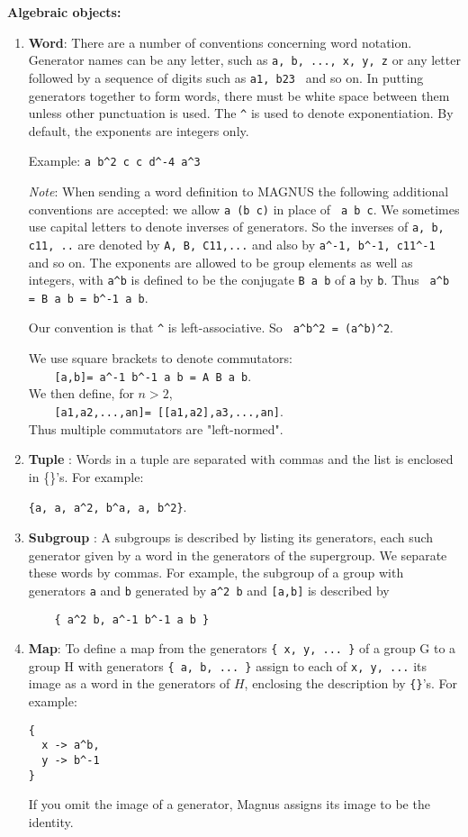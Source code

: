 \documentclass[12pt]{article}
\begin{document}
\textbf{ Algebraic objects:}
\begin{enumerate}
\item \textbf{Word}:
There are a number of conventions concerning word notation.
Generator names can be any letter, such as 
\verb+a, b, ..., x, y, z+
or any letter followed by a sequence of digits such as 
\verb+a1, b23 +
and so on. In putting generators together to form words, there
must be white space between them unless other punctuation is
used. The \verb+^+ is used to denote exponentiation. By default, the
exponents are integers only.

Example: \verb+a b^2 c c d^-4 a^3+

{\em Note}: When sending a word definition to MAGNUS the
following additional conventions are accepted: we allow \verb+a (b c)+
in place of \verb+ a b c+. We sometimes use capital letters to denote
inverses of generators. So the inverses of \verb+a, b, c11, ..+ are
denoted by \verb+A, B, C11,...+ and also by \verb+a^-1, b^-1, c11^-1 +and so
on.  The exponents are allowed to be group elements as well as
integers, with \verb+a^b+ is defined to be the conjugate \verb+B a b+ of 
\verb+a+ by \verb+b+.
Thus \verb+ a^b = B a b = b^-1 a b+.

Our convention is that \verb+^+ is left-associative. So 
\verb+ a^b^2 = (a^b)^2+.

We use square brackets to denote commutators:\\ 
\verb+    [a,b]= a^-1 b^-1 a b = A B a b+.\\
We then define, for $n > 2$, \\
\verb+    [a1,a2,...,an]= [[a1,a2],a3,...,an]+.\\
Thus multiple commutators are "left-normed".

\item \textbf{Tuple} :
Words in a tuple are separated  with
commas and the list is enclosed in \{\}'s. For
example:

\verb+{a, a, a^2, b^a, a, b^2}+.


\item \textbf{Subgroup} : 
A subgroups is described by listing its generators, each such
generator given by a word in the generators of the supergroup. We
separate these words by commas. For example, the subgroup of a
group with generators \verb+a+ and \verb+b+ generated 
by \verb+a^2 b+ and \verb+[a,b]+ is
described by

\verb+    { a^2 b, a^-1 b^-1 a b }+


\item \textbf{ Map}:
To define a map from the generators
\verb+{ x, y, ... }+
of a group G to a group H with generators
\verb+{ a, b, ... }+
assign to each of \verb+x, y, ...+ its image as a word in the generators
of $H$, enclosing the description by \verb+{}+'s. For example:
\begin{verbatim}
{
  x -> a^b,
  y -> b^-1
}
\end{verbatim}
If you omit the image of a generator, Magnus assigns its image to
be the identity.


\end{enumerate}
\end{document}
